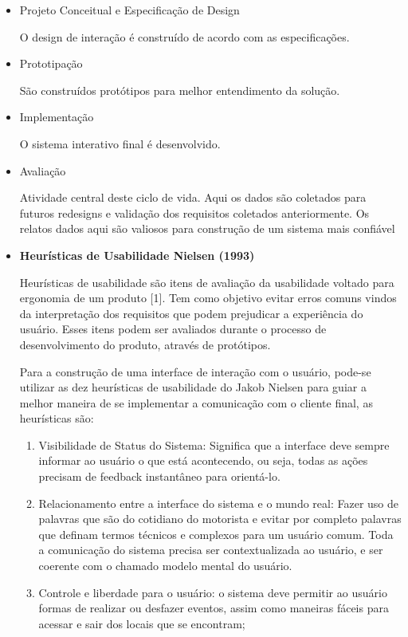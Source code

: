 \begin{enumerate}
\begin{itemize}
\item Projeto Conceitual e Especificação de Design

O design de interação é construído de acordo com as especificações.

\item Prototipação

São construídos protótipos para melhor entendimento da solução.

\item Implementação

O sistema interativo final é desenvolvido.

\item Avaliação

Atividade central deste ciclo de vida. Aqui os dados são coletados para futuros redesigns e validação dos requisitos coletados anteriormente. Os relatos dados aqui são valiosos para construção de um sistema mais confiável


\item \textbf{Heurísticas de Usabilidade Nielsen (1993)}
	
Heurísticas de usabilidade são itens de avaliação da usabilidade voltado para ergonomia de um produto [1]. Tem como objetivo evitar erros comuns vindos da interpretação dos requisitos que podem prejudicar a experiência do usuário. Esses itens podem ser avaliados durante o processo de desenvolvimento do produto, através de protótipos.

Para a construção de uma interface de interação com o usuário, pode-se utilizar as dez heurísticas de usabilidade do Jakob Nielsen para guiar a melhor maneira de se implementar a comunicação com o cliente final, as heurísticas são:
\begin{enumerate}
\item Visibilidade de Status do Sistema: Significa que a interface deve sempre informar ao usuário o que está acontecendo, ou seja, todas as ações precisam de feedback instantâneo para orientá-lo.

\item Relacionamento entre a interface do sistema e o mundo real:  Fazer uso de palavras que são do cotidiano do motorista e evitar por completo palavras que definam termos técnicos e complexos para um usuário comum. Toda a comunicação do sistema precisa ser contextualizada ao usuário, e ser coerente com o chamado modelo mental do usuário.

\item Controle e liberdade para o usuário: o sistema deve permitir ao usuário formas de realizar ou desfazer eventos, assim como maneiras fáceis para acessar e sair dos locais que se encontram;


\end{enumerate}
\end{itemize}
\end{enumerate}
